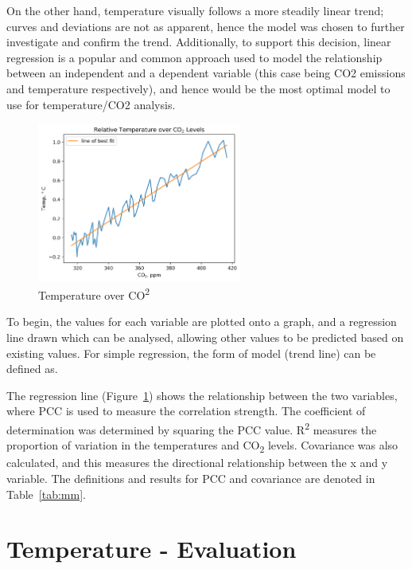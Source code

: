 \documentclass[12pt]{mcmthesis}
\begin{document}
    On the other hand, temperature visually follows a more steadily linear trend; curves and deviations are not as apparent, hence the model was chosen to further investigate and confirm the trend. Additionally, to support this decision, linear regression is a popular and common approach used to model the relationship between an independent and a dependent variable (this case being CO2 emissions and temperature respectively), and hence would be the most optimal model to use for temperature/CO2 analysis.

    \begin{figure}
        \centering
        \includegraphics[width=0.6\textwidth]{ct2}
        \caption{Temperature over CO\textsuperscript{2}}
        \label{fig:ct}
    \end{figure}

    To begin, the values for each variable are plotted onto a graph, and a regression line drawn which can be analysed, allowing other values to be predicted based on existing values. For simple regression, the form of model (trend line) can be defined as.

    The regression line (Figure~\ref{fig:ct}) shows the relationship between the two variables, where PCC is used to measure the correlation strength. The coefficient of determination was determined by squaring the PCC value. R\textsuperscript{2} measures the proportion of variation in the temperatures and CO\textsubscript{2} levels. Covariance was also calculated, and this measures the directional relationship between the x and y variable. The definitions and results for PCC and covariance are denoted in Table~\ref{tab:mm}.



    \section{Temperature - Evaluation}
\end{document}
